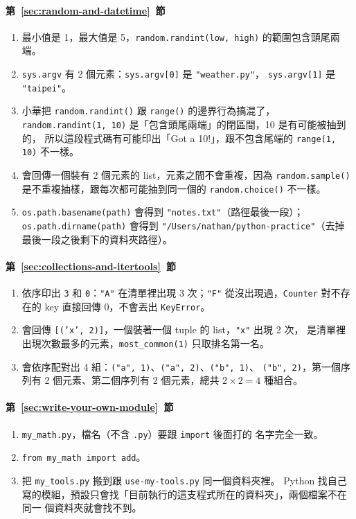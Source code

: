 \paragraph{第~\ref{sec:random-and-datetime}~節}
\begin{enumerate}
\item 最小值是 1，最大值是 5，\texttt{random.randint(low, high)} 的範圍包含頭尾兩端。
\item \texttt{sys.argv} 有 2 個元素：\texttt{sys.argv[0]} 是 \texttt{"weather.py"}，
\texttt{sys.argv[1]} 是 \texttt{"taipei"}。
\item 小華把 \texttt{random.randint()} 跟 \texttt{range()} 的邊界行為搞混了，
\texttt{random.randint(1, 10)} 是「包含頭尾兩端」的閉區間，10 是有可能被抽到的，
所以這段程式碼有可能印出「Got a 10!」，跟不包含尾端的 \texttt{range(1, 10)} 不一樣。
\item 會回傳一個裝有 2 個元素的 list，元素之間不會重複，因為 \texttt{random.sample()}
是不重複抽樣，跟每次都可能抽到同一個的 \texttt{random.choice()} 不一樣。
\item \texttt{os.path.basename(path)} 會得到 \texttt{"notes.txt"}（路徑最後一段）；
\texttt{os.path.dirname(path)} 會得到 \texttt{"/Users/nathan/python-practice"}（去掉
最後一段之後剩下的資料夾路徑）。
\end{enumerate}

\paragraph{第~\ref{sec:collections-and-itertools}~節}
\begin{enumerate}
\item 依序印出 \texttt{3} 和 \texttt{0}：\texttt{"A"} 在清單裡出現 3 次；\texttt{"F"}
從沒出現過，\texttt{Counter} 對不存在的 key 直接回傳 0，不會丟出 \texttt{KeyError}。
\item 會回傳 \texttt{[('x', 2)]}，一個裝著一個 tuple 的 list，\texttt{"x"} 出現 2 次，
是清單裡出現次數最多的元素，\texttt{most\_common(1)} 只取排名第一名。
\item 會依序配對出 4 組：\texttt{("a", 1)}、\texttt{("a", 2)}、\texttt{("b", 1)}、
\texttt{("b", 2)}，第一個序列有 2 個元素、第二個序列有 2 個元素，總共 $2 \times 2 = 4$
種組合。
\end{enumerate}

\paragraph{第~\ref{sec:write-your-own-module}~節}
\begin{enumerate}
\item \texttt{my\_math.py}，檔名（不含 \texttt{.py}）要跟 \texttt{import} 後面打的
名字完全一致。
\item \texttt{from my\_math import add}。
\item 把 \texttt{my\_tools.py} 搬到跟 \texttt{use-my-tools.py} 同一個資料夾裡。
Python 找自己寫的模組，預設只會找「目前執行的這支程式所在的資料夾」，兩個檔案不在同一
個資料夾就會找不到。
\end{enumerate}
